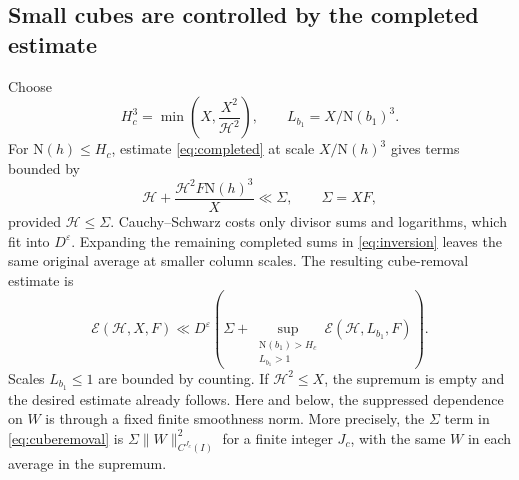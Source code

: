 \documentclass[11pt]{article}
\newcommand{\N}{\mathrm N}
\newcommand{\E}{\mathcal E}
\numberwithin{equation}{section}
\begin{document}
\subsection{Small cubes are controlled by the completed estimate}
Choose
\begin{equation}\label{eq:Hc}
 H_c^3=\min\left(X,\frac{X^2}{\mathcal H^2}\right),\qquad
 L_{b_1}=X/\N(b_1)^3.
\end{equation}
For $\N(h)\le H_c$, estimate \eqref{eq:completed} at scale
$X/\N(h)^3$ gives terms bounded by
\begin{equation}\label{eq:smallcubes}
 \mathcal H+\frac{\mathcal H^2F\N(h)^3}X\ll\Sigma,
 \qquad\Sigma=XF,
\end{equation}
provided $\mathcal H\le\Sigma$. Cauchy--Schwarz costs only divisor sums
and logarithms, which fit into $D^\varepsilon$.
Expanding the remaining completed sums in \eqref{eq:inversion} leaves
the same original average at smaller column scales. The resulting
cube-removal estimate \cite[Lemma~5.3]{original} is
\begin{equation}\label{eq:cuberemoval}
 \E(\mathcal H,X,F)\ll D^\varepsilon
 \left(\Sigma+
   \sup_{\substack{\N(b_1)>H_c\\L_{b_1}>1}}
                  \E(\mathcal H,L_{b_1},F)\right).
\end{equation}
Scales $L_{b_1}\le1$ are bounded by counting. If $\mathcal H^2\le X$,
the supremum is empty and the desired estimate already follows.
Here and below, the suppressed dependence on $W$ is through a fixed
finite smoothness norm. More precisely, the $\Sigma$ term in
\eqref{eq:cuberemoval} is $\Sigma\|W\|_{C^{J_c}(I)}^2$ for a finite
integer $J_c$, with the same $W$ in each average in the supremum.
\end{document}
